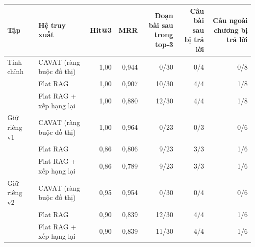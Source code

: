 \footnotesize
\setlength{\tabcolsep}{3pt}
\begin{tabular}{@{}llrrrrr@{}}
\toprule
Tập & Hệ truy xuất & Hit@3 & MRR & \makecell{Đoạn bài sau\\trong top-3} & \makecell{Câu bài sau\\bị trả lời} & \makecell{Câu ngoài\\chương bị trả lời} \\
\midrule
Tinh chỉnh & CAVAT (ràng buộc đồ thị) & 1,00 & 0,944 & 0/30 & 0/4 & 0/8 \\
 & Flat RAG & 1,00 & 0,907 & 10/30 & 4/4 & 1/8 \\
 & Flat RAG + xếp hạng lại & 1,00 & 0,880 & 12/30 & 4/4 & 1/8 \\
\midrule
Giữ riêng v1 & CAVAT (ràng buộc đồ thị) & 1,00 & 0,964 & 0/23 & 0/3 & 0/6 \\
 & Flat RAG & 0,86 & 0,806 & 9/23 & 3/3 & 1/6 \\
 & Flat RAG + xếp hạng lại & 0,86 & 0,789 & 9/23 & 3/3 & 1/6 \\
\midrule
Giữ riêng v2 & CAVAT (ràng buộc đồ thị) & 0,95 & 0,954 & 0/30 & 0/4 & 0/6 \\
 & Flat RAG & 0,90 & 0,839 & 12/30 & 4/4 & 1/6 \\
 & Flat RAG + xếp hạng lại & 0,90 & 0,839 & 11/30 & 4/4 & 1/6 \\
\bottomrule
\end{tabular}
